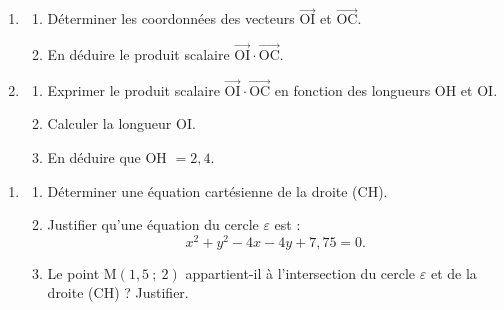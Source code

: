 \documentclass[10pt]{article}
\providecommand{\vect}[1]{\overrightarrow{#1}}
\begin{document}
\begin{enumerate}
\item 
	\begin{enumerate}
	\item Déterminer les coordonnées des vecteurs $\vect{\text{OI}}$ et $\vect{\text{OC}}$.
	\item En déduire le produit scalaire $\vect{\text{OI}} \cdot \vect{\text{OC}}$.
	\end{enumerate}

\bigskip

\item 
	\begin{enumerate}
	\item Exprimer le produit scalaire $\vect{\text{OI}} \cdot \vect{\text{OC}}$ en fonction des longueurs OH et OI.
	\item Calculer la longueur OI.
	\item En déduire que OH $= 2,4$.
	\end{enumerate}
\end{enumerate}

\begin{center}
\begin{minipage}{0.75\textwidth}
\begin{enumerate}[start=3]
\item 
	\begin{enumerate}
	\item Déterminer une équation cartésienne de la droite (CH).
	\item Justifier qu'une équation du cercle $\varepsilon$ est :
\[x^2 + y^2 - 4x - 4y + 7,75 = 0.\]
	\item Le point M$(1,5~;~2)$ appartient-il à l'intersection du cercle $\varepsilon$ et de la droite (CH) ? Justifier.
	\end{enumerate}
\end{enumerate}
\end{minipage}
\hfill
{}
\end{center}
\end{document}
